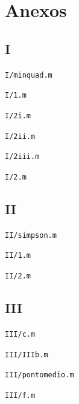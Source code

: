 \documentclass[portuguese, a4paper]{article}
\newcommand\tu[0]{\textunderscore}
\begin{document}
\newpage
\section{Anexos}
\subsection{I}
	\texttt{I/min\tu quad.m}
	

	\texttt{I/1.m}
	

	\texttt{I/2\tu i.m}
	

	\texttt{I/2\tu ii.m}
	

	\texttt{I/2\tu iii.m}
	

	\texttt{I/2.m}
	

\newpage
\subsection{II}
	\texttt{II/simpson.m}
	

	\texttt{II/1.m}
	

	\texttt{II/2.m}
	

\newpage
\subsection{III}
	\texttt{III/c.m}
	

	\texttt{III/III\tu b.m}
	

	\texttt{III/ponto\tu medio.m}
	

	\texttt{III/f.m}
	
\end{document}
